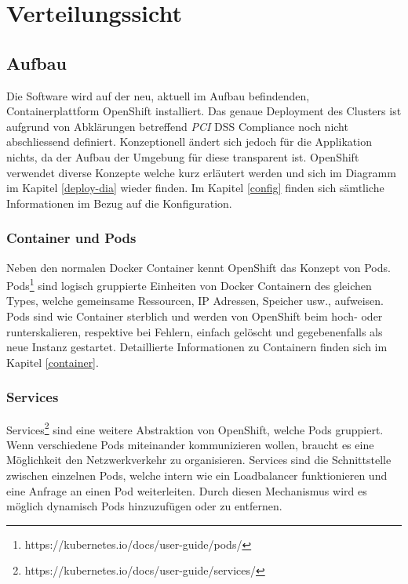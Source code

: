 \graphicspath{{./images/}}

\chapter{Verteilungssicht}
\label{deploy}

\section{Aufbau}
Die Software wird auf der neu, aktuell im Aufbau befindenden, Containerplattform OpenShift installiert. Das genaue Deployment des Clusters ist aufgrund von Abklärungen betreffend \textit{\gls{PCI}} DSS Compliance noch nicht abschliessend definiert. Konzeptionell ändert sich jedoch für die Applikation nichts, da der Aufbau der Umgebung für diese transparent ist.
OpenShift verwendet diverse Konzepte welche kurz erläutert werden und sich im Diagramm im Kapitel \ref{deploy-dia} wieder finden. Im Kapitel \ref{config} finden sich sämtliche Informationen im Bezug auf die Konfiguration.

\subsection{Container und Pods}

Neben den normalen Docker Container kennt OpenShift das Konzept von Pods. Pods\footnote{https://kubernetes.io/docs/user-guide/pods/} sind logisch gruppierte Einheiten von Docker Containern des gleichen Types, welche gemeinsame Ressourcen, IP Adressen, Speicher usw.,  aufweisen. Pods sind wie Container sterblich und werden von OpenShift beim hoch- oder runterskalieren, respektive bei Fehlern, einfach gelöscht und gegebenenfalls als neue Instanz gestartet. Detaillierte Informationen zu Containern finden sich im Kapitel \ref{container}.

\subsection{Services}

Services\footnote{https://kubernetes.io/docs/user-guide/services/} sind eine weitere Abstraktion von OpenShift, welche Pods gruppiert. Wenn verschiedene Pods miteinander kommunizieren wollen, braucht es eine Möglichkeit den Netzwerkverkehr zu organisieren. Services sind die Schnittstelle zwischen einzelnen Pods, welche intern wie ein Loadbalancer funktionieren und eine Anfrage an einen Pod weiterleiten. Durch diesen Mechanismus wird es möglich dynamisch Pods hinzuzufügen oder zu entfernen.

